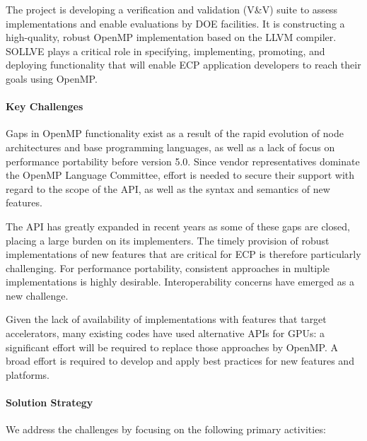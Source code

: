 The project is  developing a verification and validation (V\&V) suite to assess implementations and
enable evaluations by DOE  facilities. It is constructing a high-quality,  robust 
OpenMP implementation based on the LLVM compiler. 
 SOLLVE plays a critical
role in specifying, implementing, promoting, and deploying functionality
that will enable ECP application developers to reach their goals using OpenMP.

\paragraph{Key  Challenges}
Gaps in OpenMP functionality exist as a result of the rapid evolution of node architectures and  base programming languages, as well as a lack of focus on performance portability before version 5.0.  
 Since vendor representatives dominate the  OpenMP Language Committee, effort is needed  to secure their support with regard to the scope of the API, as well as  the syntax and semantics of new features.

The API has greatly expanded in recent years as some of these gaps are closed, placing a large burden on its implementers. 
The timely provision of  robust implementations of new features that are critical for ECP is therefore particularly challenging.
For performance portability, consistent approaches in multiple implementations is highly desirable. Interoperability concerns have emerged as a  new challenge.
 

Given the lack of availability of implementations with features that target accelerators, many existing codes have used alternative APIs for GPUs: a significant effort will be required to replace those approaches by OpenMP. A broad effort is required to develop and apply best practices for new features and platforms. 

\paragraph{Solution Strategy}
We address the challenges by focusing on the following primary activities:

